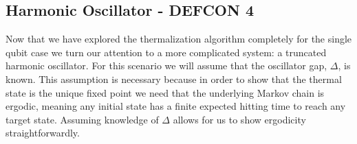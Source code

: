 \documentclass{article}
\begin{document}
\subsection{Harmonic Oscillator - DEFCON 4} \label{sec:harmonic_oscillator}
Now that we have explored the thermalization algorithm completely for the single qubit case we turn our attention to a more complicated system: a truncated harmonic oscillator. For this scenario we will assume that the oscillator gap, $\Delta$, is known. This assumption is necessary because in order to show that the thermal state is the unique fixed point we need that the underlying Markov chain is ergodic, meaning any initial state has a finite expected hitting time to reach any target state. Assuming knowledge of $\Delta$ allows for us to show ergodicity straightforwardly.
\end{document}
